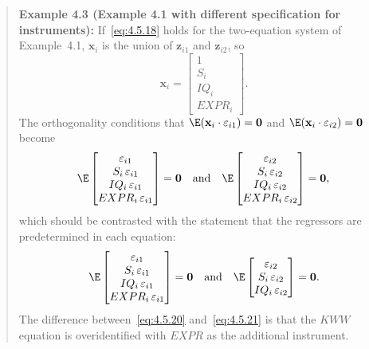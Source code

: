 \begin{quote}
\textbf{Example 4.3 (Example 4.1 with different specification for instruments):}\quad
If~\eqref{eq:4.5.18} holds for the two-equation system of Example~4.1,
$\mathbf{x}_i$ is the union of $\mathbf{z}_{i1}$ and $\mathbf{z}_{i2}$, so
\begin{equation}
\mathbf{x}_i = \begin{bmatrix} 1 \\ S_i \\ IQ_i \\ EXPR_i \end{bmatrix}.
\label{eq:4.5.19}
\end{equation}
The orthogonality conditions that $\E(\mathbf{x}_i \cdot \varepsilon_{i1}) = \mathbf{0}$
and $\E(\mathbf{x}_i \cdot \varepsilon_{i2}) = \mathbf{0}$ become
\begin{equation}
\E \begin{bmatrix}
\varepsilon_{i1} \\ S_i\, \varepsilon_{i1} \\
IQ_i\, \varepsilon_{i1} \\ EXPR_i\, \varepsilon_{i1}
\end{bmatrix} = \mathbf{0}
\quad \text{and} \quad
\E \begin{bmatrix}
\varepsilon_{i2} \\ S_i\, \varepsilon_{i2} \\
IQ_i\, \varepsilon_{i2} \\ EXPR_i\, \varepsilon_{i2}
\end{bmatrix} = \mathbf{0},
\label{eq:4.5.20}
\end{equation}
which should be contrasted with the statement that the regressors are predetermined
in each equation:
\begin{equation}
\E \begin{bmatrix}
\varepsilon_{i1} \\ S_i\, \varepsilon_{i1} \\
IQ_i\, \varepsilon_{i1} \\ EXPR_i\, \varepsilon_{i1}
\end{bmatrix} = \mathbf{0}
\quad \text{and} \quad
\E \begin{bmatrix}
\varepsilon_{i2} \\ S_i\, \varepsilon_{i2} \\
IQ_i\, \varepsilon_{i2}
\end{bmatrix} = \mathbf{0}.
\label{eq:4.5.21}
\end{equation}
The difference between~\eqref{eq:4.5.20} and~\eqref{eq:4.5.21} is that the $KWW$
equation is overidentified with $EXPR$ as the additional instrument.
\end{quote}

